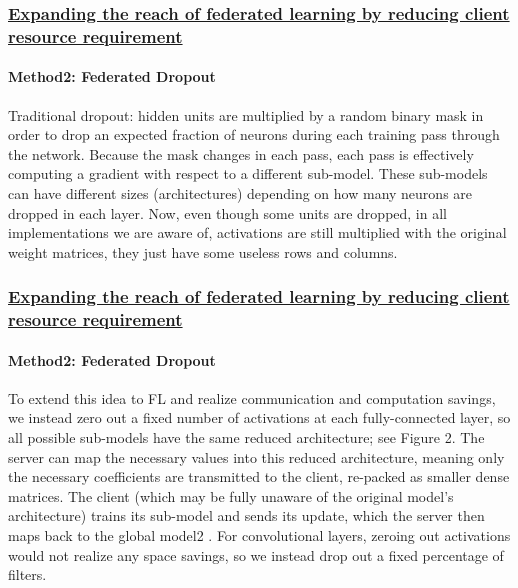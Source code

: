 \documentclass[10pt]{beamer}
\begin{document}
    \begin{frame}
        
        \frametitle{
            \href{https://arxiv.org/pdf/1812.07210.pdf}{
            Expanding the reach of federated learning by reducing client resource requirement
            }
        }

        \framesubtitle{
            Method2: Federated Dropout 
        }


        Traditional dropout: hidden units are multiplied by a random binary mask in order to drop an expected fraction of neurons during each training pass through the network. Because the mask changes in each pass, each pass is effectively computing a gradient with respect to a different sub-model. These sub-models can have different sizes (architectures) depending on how many neurons are dropped in each layer. Now, even though some units are dropped, in all implementations we are aware of, activations are still multiplied with the original weight matrices, they just have
        some useless rows and columns.

    \end{frame}

    \begin{frame}
        
        \frametitle{
            \href{https://arxiv.org/pdf/1812.07210.pdf}{
            Expanding the reach of federated learning by reducing client resource requirement
            }
        }

        \framesubtitle{
            Method2: Federated Dropout 
        }


        To extend this idea to FL and realize communication and computation savings, we instead zero out a fixed number of
        activations at each fully-connected layer, so all possible sub-models have the same reduced architecture; see Figure 2.
        The server can map the necessary values into this reduced architecture, meaning only the necessary coefficients are
        transmitted to the client, re-packed as smaller dense matrices. The client (which may be fully unaware of the original
        model’s architecture) trains its sub-model and sends its update, which the server then maps back to the global model2
        . For convolutional layers, zeroing out activations would not realize any space savings, so we instead drop out a fixed
        percentage of filters.

    \end{frame}
\end{document}
